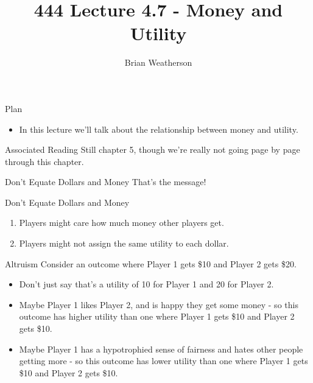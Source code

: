 \documentclass[
  ignorenonframetext,
]{beamer}
\title{444 Lecture 4.7 - Money and Utility}
\author{Brian Weatherson}
\date{}
\providecommand{\tightlist}{%
  \setlength{\itemsep}{0pt}\setlength{\parskip}{0pt}}
\begin{document}
\frame{\titlepage}

\begin{frame}{Plan}
\protect\hypertarget{plan}{}
\begin{itemize}
\tightlist
\item
  In this lecture we'll talk about the relationship between money and
  utility.
\end{itemize}
\end{frame}

\begin{frame}{Associated Reading}
\protect\hypertarget{associated-reading}{}
Still chapter 5, though we're really not going page by page through this
chapter.
\end{frame}

\begin{frame}{Don't Equate Dollars and Money}
\protect\hypertarget{dont-equate-dollars-and-money}{}
That's the message!
\end{frame}

\begin{frame}{Don't Equate Dollars and Money}
\protect\hypertarget{dont-equate-dollars-and-money-1}{}
\begin{enumerate}[<+->]
\tightlist
\item
  Players might care how much money other players get.
\item
  Players might not assign the same utility to each dollar.
\end{enumerate}
\end{frame}

\begin{frame}{Altruism}
\protect\hypertarget{altruism}{}
Consider an outcome where Player 1 gets \$10 and Player 2 gets \$20.

\begin{itemize}
\tightlist
\item
  Don't just say that's a utility of 10 for Player 1 and 20 for Player
  2.
\item
  Maybe Player 1 likes Player 2, and is happy they get some money - so
  this outcome has higher utility than one where Player 1 gets \$10 and
  Player 2 gets \$10.
\item
  Maybe Player 1 has a hypotrophied sense of fairness and hates other
  people getting more - so this outcome has lower utility than one where
  Player 1 gets \$10 and Player 2 gets \$10.
\end{itemize}
\end{frame}
\end{document}
